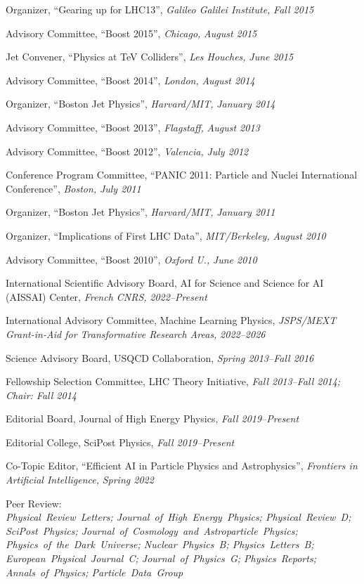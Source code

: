 \item Organizer, ``Gearing up for LHC13'', \emph{Galileo Galilei Institute, }\emph{Fall 2015}
\item Advisory Committee, ``Boost 2015'', \emph{Chicago, }\emph{August 2015}
\item Jet Convener, ``Physics at TeV Colliders'', \emph{Les Houches, }\emph{June 2015}
\item Advisory Committee, ``Boost 2014'', \emph{London, }\emph{August 2014}
\item Organizer, ``Boston Jet Physics'', \emph{Harvard/MIT, }\emph{January 2014}
\item Advisory Committee, ``Boost 2013'', \emph{Flagstaff, }\emph{August 2013}
\item Advisory Committee, ``Boost 2012'', \emph{Valencia, }\emph{July 2012}
\item Conference Program Committee, ``PANIC 2011: Particle and Nuclei International Conference'', \emph{Boston, }\emph{July 2011}
\item Organizer, ``Boston Jet Physics'', \emph{Harvard/MIT, }\emph{January 2011}
\item Organizer, ``Implications of First LHC Data'', \emph{MIT/Berkeley, }\emph{August 2010}
\item Advisory Committee, ``Boost 2010'', \emph{Oxford U., }\emph{June 2010}
\item International Scientific Advisory Board, AI for Science and Science for AI (AISSAI) Center, \emph{French CNRS, }\emph{2022--Present}
\item International Advisory Committee, Machine Learning Physics, \emph{JSPS/MEXT Grant-in-Aid for Transformative Research Areas, }\emph{2022--2026}
\item Science Advisory Board, USQCD Collaboration, \emph{Spring 2013--Fall 2016}
\item Fellowship Selection Committee, LHC Theory Initiative, \emph{Fall 2013--Fall 2014; Chair: Fall 2014}
\item Editorial Board, Journal of High Energy Physics, \emph{Fall 2019--Present}
\item Editorial College, SciPost Physics, \emph{Fall 2019--Present}
\item Co-Topic Editor, ``Efficient AI in Particle Physics and Astrophysics'', \emph{Frontiers in Artificial Intelligence, }\emph{Spring 2022}
\item \raggedright Peer Review: \\ \textit{\nohyphens{Physical~Review~Letters; Journal~of~High~Energy~Physics; Physical~Review~D; SciPost~Physics; Journal~of~Cosmology~and~Astroparticle~Physics; Physics~of~the~Dark~Universe; Nuclear~Physics~B; Physics~Letters~B; European~Physical~Journal~C; Journal~of~Physics~G; Physics~Reports; Annals~of~Physics; Particle~Data~Group}}
